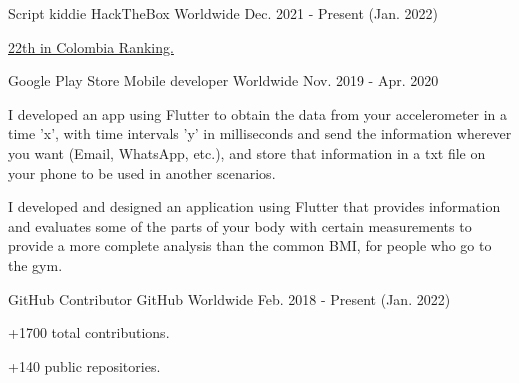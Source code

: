 
\begin{cventries}

  \cventry
    {Script kiddie} %
    {HackTheBox} %
    {Worldwide} %
    {Dec. 2021 - Present (Jan. 2022)} %
    {
      \begin{cvitems} %
        \item {\href{https://app.hackthebox.com/rankings/country/CO}{22th in Colombia Ranking.}}
      \end{cvitems}
    }

  \cventry
    {Google Play Store} %
    {Mobile developer} %
    {Worldwide} %
    {Nov. 2019 - Apr. 2020} %
    {
      \begin{cvitems} %
        \item {I developed an app using Flutter to obtain the data from your accelerometer in a time
        'x', with time intervals 'y' in milliseconds and send the information wherever you want
        (Email, WhatsApp, etc.), and store that information in a txt file on your phone to be used 
        in another scenarios.}
        \item {I developed and designed an application using Flutter that provides information and
        evaluates some of the parts of your body with certain measurements to provide a more
        complete analysis than the common BMI, for people who go to the gym.}
      \end{cvitems}
    }

  \cventry
    {GitHub Contributor} %
    {GitHub} %
    {Worldwide} %
    {Feb. 2018 - Present (Jan. 2022)} %
    {
      \begin{cvitems} %
        \item {+1700 total contributions.}
        \item {+140 public repositories.}
      \end{cvitems}
    }

\end{cventries}
